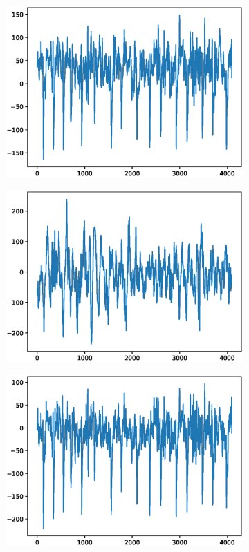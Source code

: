 \documentclass[12pt]{article}
\begin{document}
\begin{figure}
\begin{subfigure}{.25\textwidth}
  \centering
  \includegraphics[width=.8\linewidth]{figures/signals/C/N016.eps}
\end{subfigure}%
\begin{subfigure}{.25\textwidth}
  \centering
  \includegraphics[width=.8\linewidth]{figures/signals/C/N034.eps}
\end{subfigure}
\begin{subfigure}{.25\textwidth}
  \centering
  \includegraphics[width=.8\linewidth]{figures/signals/C/N065.eps}

\end{subfigure}
\end{figure}
\end{document}
